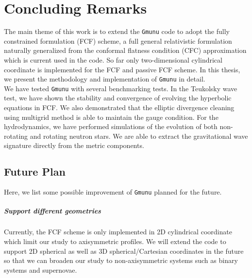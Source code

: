 
\chapter{Concluding Remarks}  %

\ifpdf
    \graphicspath{{Chapter5/Figs/PDF/}{Chapter5/Figs/}}
\else
    \graphicspath{{Chapter5/Figs/}}
\fi
The main theme of this work is to extend the \texttt{Gmunu} code to adopt the
fully constrained formulation (FCF) scheme,
a full general relativistic formulation naturally generalized from the conformal flatness condition (CFC) approximation
which is current used in the code.
So far only two-dimensional cylindrical coordinate is implemented for the FCF and passive FCF scheme.
In this thesis, we present the methodology and implementation of \texttt{Gmunu} in detail.\\
We have tested \texttt{Gmunu} with several benchmarking tests.
In the Teukolsky wave test, we have shown the stability and convergence of evolving the hyperbolic equations in FCF.
We also demonstrated that the elliptic divergence cleaning using multigrid method is able to maintain the gauge condition.
For the hydrodynamics,
we have performed simulations of the evolution of both non-rotating and rotating neutron stars.
We are able to extract the gravitational wave signature directly from the metric components.

\section*{Future Plan}
Here, we list some possible improvement of \texttt{Gmunu} planned for the future.

\paragraph{Support different geometries}
Currently, the FCF scheme is only implemented in 2D cylindrical coordinate
which limit our study to axisymmetric profiles.
We will extend the code to support 2D spherical
as well as 3D spherical/Cartesian coordinates in the future
so that we can broaden our study to non-axisymmetric systems
such as binary systems and supernovae.

